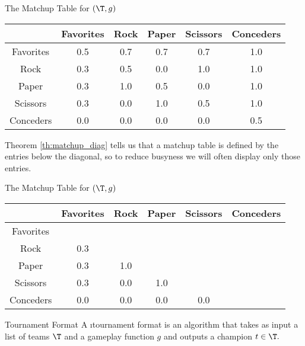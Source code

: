 {\begin{figg}{The Matchup Table for $(\T, g)$}{}
    \begin{center}
        \begin{tabular}{ c | c c c c c}
        & Favorites & Rock & Paper & Scissors & Conceders\\
        \hline
        Favorites & 0.5 & 0.7 & 0.7 & 0.7 & 1.0\\
        Rock      & 0.3 & 0.5 & 0.0 & 1.0 & 1.0\\
        Paper     & 0.3 & 1.0 & 0.5 & 0.0 & 1.0\\
        Scissors  & 0.3 & 0.0 & 1.0 & 0.5 & 1.0\\
        Conceders & 0.0 & 0.0 & 0.0 & 0.0 & 0.5
        \end{tabular}
    \end{center}
\end{figg}


Theorem \ref{th:matchup_diag} tells us that a matchup table is defined by the entries below the diagonal, so to reduce busyness we will often display only those entries.

\begin{figg}{The Matchup Table for $(\T, g)$}{}
    \begin{center}
        \begin{tabular}{ c | c c c c c}
        & Favorites & Rock & Paper & Scissors & Conceders\\
        \hline
        Favorites & &  &  &  & \\
        Rock      & 0.3 & & &  & \\
        Paper     & 0.3 & 1.0 & & & \\
        Scissors  & 0.3 & 0.0 & 1.0 & & \\
        Conceders & 0.0 & 0.0 & 0.0 & 0.0 &
        \end{tabular}
    \end{center}
\end{figg}

\begin{definition}{Tournament Format}{}
    A \i{tournament format} is an algorithm that takes as input a list of teams $\T$ and a gameplay function $g$ and outputs a champion $t \in \T.$ %
\end{definition}

}
